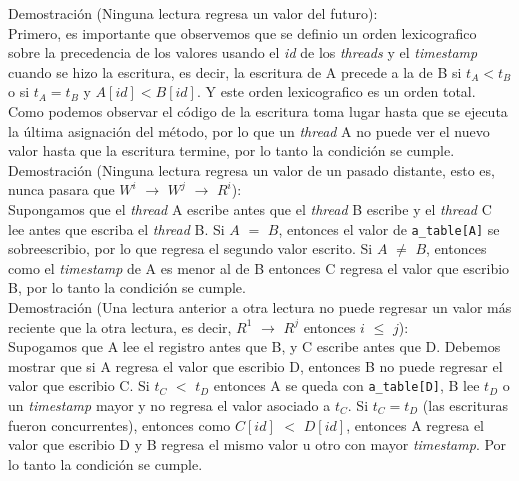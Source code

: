 \documentclass{article}
\begin{document}
\begin{enumerate}
{    Demostración (Ninguna lectura regresa un valor del futuro):\\
    Primero, es importante que observemos que se definio un orden
    lexicografico sobre la precedencia de los valores usando el
    \textit{id} de los \textit{threads} y el \textit{timestamp} cuando
    se hizo la escritura, es decir, la escritura de A precede a la de
    B si $t_A < t_B$ o si $t_A = t_B$ y $A[id] < B[id]$. Y este orden
    lexicografico es un orden total.\\
    Como podemos observar el código de la escritura toma lugar hasta
    que se ejecuta la última asignación del método, por lo que un
    \textit{thread} A no puede ver el nuevo valor hasta que la
    escritura termine, por lo tanto la condición se cumple.\\

    Demostración (Ninguna lectura regresa un valor de un pasado
    distante, esto es, nunca pasara que $W^i$ $\rightarrow$ $W^j$
    $\rightarrow$ $R^i$):\\
    Supongamos que el \textit{thread} A escribe antes que el
    \textit{thread} B escribe y el \textit{thread} C lee antes que
    escriba el \textit{thread} B. Si $A$ $=$ $B$, entonces el valor de
    \texttt{a\_table[A]} se sobreescribio, por lo que regresa el
    segundo valor escrito. Si $A$ $\neq$ $B$, entonces como el
    \textit{timestamp} de A es menor al de B entonces C regresa el
    valor que escribio B, por lo tanto la condición se cumple.\\

    Demostración (Una lectura anterior a otra lectura no puede regresar un
    valor más reciente que la otra lectura, es decir, $R^1$
    $\rightarrow$ $R^j$ entonces $i$ $\leq$ $j$):\\
    Supogamos que A lee el registro antes que B, y C escribe antes que
    D. Debemos mostrar que si A regresa el valor que escribio D,
    entonces B no puede regresar el valor que escribio C. Si $t_C$ $<$
    $t_D$ entonces A se queda con \texttt{a\_table[D]}, B lee $t_D$ o
    un \textit{timestamp} mayor y no regresa el valor asociado a
    $t_C$. Si $t_C = t_D$ (las escrituras fueron concurrentes),
    entonces como $C[id]$ $<$ $D[id]$, entonces A regresa el valor que
    escribio D y B regresa el mismo valor u otro con mayor
    \textit{timestamp}. Por lo tanto la condición se cumple.\\
  }
  
\end{enumerate}
\end{document}
